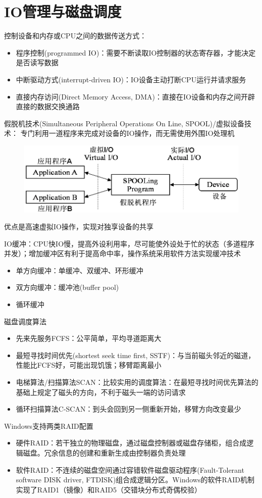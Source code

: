 
\section{IO管理与磁盘调度}
控制设备和内存或CPU之间的数据传送方式：
\begin{itemize}
    \item 程序控制(programmed IO)：需要不断读取IO控制器的状态寄存器，才能决定是否读写数据
    \item 中断驱动方式(interrupt-driven IO)：IO设备主动打断CPU运行并请求服务
    \item 直接内存访问(Direct Memory Access, DMA)：直接在IO设备和内存之间开辟直接的数据交换通路
\end{itemize}

假脱机技术(Simultaneous Peripheral Operations On Line, SPOOL)/虚拟设备技术：
专门利用一道程序来完成对设备的IO操作，而无需使用外围IO处理机
\begin{figure}[H]
    \centering
    \includegraphics[width=0.7\linewidth]{fig/SPOOLing.png}
\end{figure}
优点是高速虚拟IO操作，实现对独享设备的共享

IO缓冲：CPU快IO慢，提高外设利用率，尽可能使外设处于忙的状态（多道程序并发）；增加缓冲区有利于提高命中率，操作系统采用软件方法实现缓冲技术
\begin{itemize}
    \item 单方向缓冲：单缓冲、双缓冲、环形缓冲
    \item 双方向缓冲：缓冲池(buffer pool)
    \item 循环缓冲
\end{itemize}

磁盘调度算法
\begin{itemize}
    \item 先来先服务FCFS：公平简单，平均寻道距离大
    \item 最短寻找时间优先(shortest seek time first, SSTF)：与当前磁头邻近的磁道，性能比FCFS好，可能出现饥饿；移臂距离最小
    \item 电梯算法/扫描算法SCAN：比较实用的调度算法：在最短寻找时间优先算法的基础上规定了磁头的方向，不利于磁头一端的访问请求
    \item 循环扫描算法C-SCAN：到头会回到另一侧重新开始，移臂方向改变最少
\end{itemize}

Windows支持两类RAID配置
\begin{itemize}
\item 硬件RAID：若干独立的物理磁盘，通过磁盘控制器或磁盘存储柜，组合成逻辑磁盘。冗余信息的创建和重新生成由控制器负责处理
\item 软件RAID：不连续的磁盘空间通过容错软件磁盘驱动程序(Fault-Tolerant software DISK driver, FTDISK)组合成逻辑分区。Windows的软件RAID机制实现了RAID1（镜像）和RAID5（交错块分布式奇偶校验）
\end{itemize}